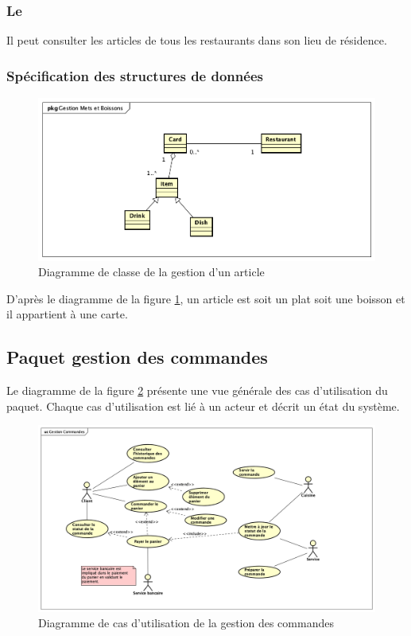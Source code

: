 \subsubsection*{Le \cl}
Il peut consulter les articles de tous les restaurants dans son lieu de résidence.

\subsubsection{Spécification des structures de données}
\begin{figure}[H]
	\centering
	\includegraphics[scale=0.4]{assets/images/gestion_items.png}
	\caption{Diagramme de classe de la gestion d'un article}
	\label{fig.13}
\end{figure}

D'après le diagramme de la figure \ref{fig.13}, un article est soit un plat soit une boisson et il appartient à une carte.

\subsection{Paquet gestion des commandes}
Le diagramme de la figure  \ref{fig.14} présente une vue générale des cas d'utilisation du paquet. Chaque cas d'utilisation est lié à un acteur et décrit un état du système.
\begin{figure}[H]
	\centering
	\includegraphics[scale=0.4]{assets/images/gestion_command_uc.png}
	\caption{Diagramme de cas d'utilisation de la gestion des commandes}
	\label{fig.14}
\end{figure}
